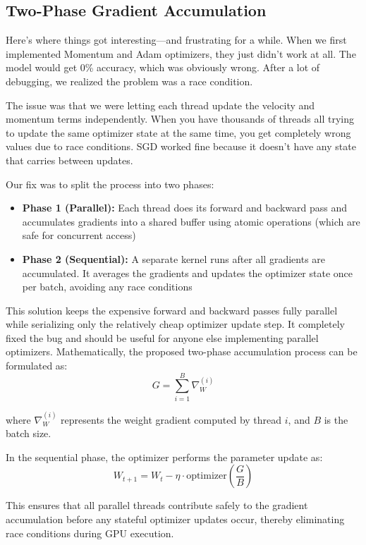 \documentclass[conference]{IEEEtran}
\begin{document}
\subsection{Two-Phase Gradient Accumulation}

Here's where things got interesting—and frustrating for a while. When we first implemented Momentum and Adam optimizers, they just didn't work at all. The model would get 0\% accuracy, which was obviously wrong. After a lot of debugging, we realized the problem was a race condition.

The issue was that we were letting each thread update the velocity and momentum terms independently. When you have thousands of threads all trying to update the same optimizer state at the same time, you get completely wrong values due to race conditions. SGD worked fine because it doesn't have any state that carries between updates.

Our fix was to split the process into two phases:
\begin{itemize}
\item \textbf{Phase 1 (Parallel):} Each thread does its forward and backward pass and accumulates gradients into a shared buffer using atomic operations (which are safe for concurrent access)
\item \textbf{Phase 2 (Sequential):} A separate kernel runs after all gradients are accumulated. It averages the gradients and updates the optimizer state once per batch, avoiding any race conditions
\end{itemize}

This solution keeps the expensive forward and backward passes fully parallel while serializing only the relatively cheap optimizer update step. It completely fixed the bug and should be useful for anyone else implementing parallel optimizers.
Mathematically, the proposed two-phase accumulation process can be formulated as:
\begin{equation}
G = \sum_{i=1}^{B} \nabla_W^{(i)}
\end{equation}

where $\nabla_W^{(i)}$ represents the weight gradient computed by thread $i$, and $B$ is the batch size.

In the sequential phase, the optimizer performs the parameter update as:
\begin{equation}
W_{t+1} = W_t - \eta \cdot \text{optimizer}\left(\frac{G}{B}\right)
\end{equation}

This ensures that all parallel threads contribute safely to the gradient accumulation before any stateful optimizer updates occur, thereby eliminating race conditions during GPU execution.
\end{document}
